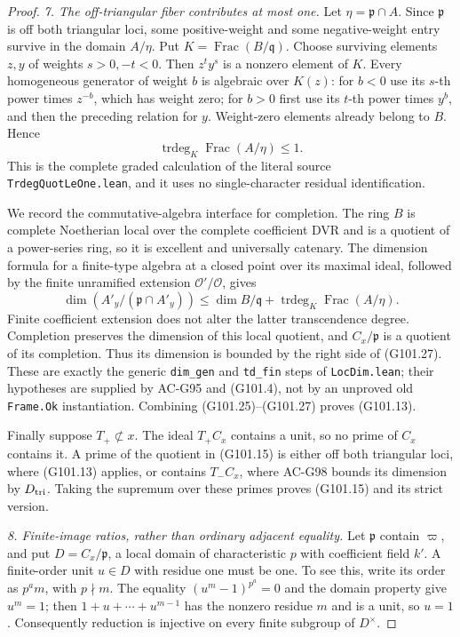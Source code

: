 \begin{proof}
\emph{7. The off-triangular fiber contributes at most one.}
Let \(\eta=\mathfrak p\cap A\).
Since \(\mathfrak p\) is off both triangular loci, some
positive-weight and some negative-weight entry survive in
the domain \(A/\eta\).
Put \(K=\operatorname{Frac}(B/\mathfrak q)\).
Choose surviving elements \(z,y\) of weights \(s>0,-t<0\).
Then \(z^t y^s\) is a nonzero element of \(K\).
Every homogeneous generator of weight \(b\) is algebraic
over \(K(z)\): for \(b<0\) use its \(s\)-th power times
\(z^{-b}\), which has weight zero; for \(b>0\) first use
its \(t\)-th power times \(y^b\), and then the preceding
relation for \(y\).  Weight-zero elements already belong
to \(B\).
Hence
\[
        \operatorname{trdeg}_{K}\operatorname{Frac}(A/\eta)
                                                        \le1.
 \tag{G101.26}
\]
This is the complete graded calculation of the literal source
\texttt{TrdegQuotLeOne.lean}, and it uses no single-character
residual identification.

We record the commutative-algebra interface for completion.
The ring \(B\) is complete Noetherian local over the complete
coefficient DVR and is a quotient of a power-series ring,
so it is excellent and universally catenary.
The dimension formula for a finite-type algebra at a closed
point over its maximal ideal, followed by the finite unramified
extension \(\mathcal O'/\mathcal O\), gives
\[
       \dim (A'_y/(\mathfrak p\cap A'_y))
          \le \dim B/\mathfrak q+
              \operatorname{trdeg}_{K}
                         \operatorname{Frac}(A/\eta).
 \tag{G101.27}
\]
Finite coefficient extension does not alter the latter
transcendence degree.
Completion preserves the dimension of this local quotient,
and \(C_x/\mathfrak p\) is a quotient of its completion.
Thus its dimension is bounded by the right side of
(G101.27).  These are exactly the generic
\texttt{dim\_gen} and \texttt{td\_fin} steps of
\texttt{LocDim.lean}; their hypotheses are supplied by
AC-G95 and (G101.4), not by an unproved old \texttt{Frame.Ok}
instantiation.
Combining (G101.25)--(G101.27) proves (G101.13).

Finally suppose \(T_+\not\subset x\).
The ideal \(T_+C_x\) contains a unit, so no prime of \(C_x\)
contains it.  A prime of the quotient in (G101.15) is either
off both triangular loci, where (G101.13) applies, or contains
\(T_-C_x\), where AC-G98 bounds its dimension by \(D_{\rm tri}\).
Taking the supremum over these primes proves (G101.15)
and its strict version.

\emph{8. Finite-image ratios, rather than ordinary adjacent equality.}
Let \(\mathfrak p\) contain \(\varpi\), and put
\(D=C_x/\mathfrak p\), a local domain of characteristic \(p\)
with coefficient field \(k'\).  A finite-order unit \(u\in D\)
with residue one must be one.  To see this, write its order
as \(p^a m\), with \(p\nmid m\).
The equality \((u^m-1)^{p^a}=0\) and the domain property
give \(u^m=1\); then
\(1+u+\cdots+u^{m-1}\) has the nonzero residue \(m\)
and is a unit, so \(u=1\).
Consequently reduction is injective on every finite subgroup
of \(D^\times\).


\end{proof}
